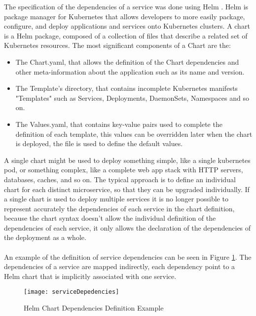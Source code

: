 The specification of the dependencies of a service was done using Helm \cite{helm}.
Helm is package manager for Kubernetes that allows developers to more easily package, configure, and deploy applications and services onto Kubernetes clusters.
A chart is a Helm package, composed of a collection of files that describe a related set of Kubernetes resources.
The most significant components of a Chart are the:
\begin{itemize}
    \item The Chart.yaml, that allows the definition of the Chart dependencies and other meta-information about the application such as its name and version.
    \item The Template's directory, that contains incomplete Kubernetes manifests "Templates" such as Services, Deployments, DaemonSets, Namespaces and so on.
    \item The Values.yaml, that contains key-value pairs used to complete the definition of each template, this values can be overridden later when the chart is deployed, the file is used to define the default values.
\end{itemize}
A single chart might be used to deploy something simple, like a single kubernetes pod, or something complex, like a complete web app stack with HTTP servers, databases, caches, and so on.
The typical approach is to define an individual chart for each distinct microservice, so that they can be upgraded individually.
If a single chart is used to deploy multiple services it is no longer possible to represent accurately the dependencies of each service
in the chart definition, because the chart syntax doesn't allow the individual definition of the dependencies of each service, it only allows the declaration of the dependencies of the deployment as a whole.

\paragraph{}

An example of the definition of service dependencies can be seen in Figure \ref{fig:serviceDepedencies}.
The dependencies of a service are mapped indirectly, each dependency point to a Helm chart that is implicitly associated with one service.

\begin{figure}[htbp]
    \centering
    \texttt{[image: serviceDepedencies]}
    \caption{Helm Chart Dependencies Definition Example}
    \label{fig:serviceDepedencies}
\end{figure}

